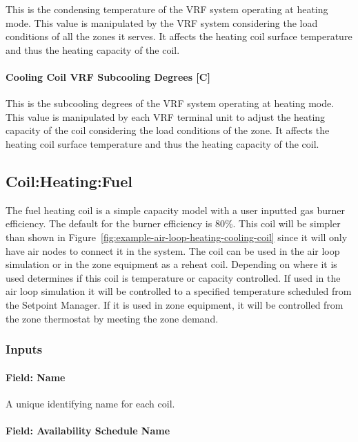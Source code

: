 This is the condensing temperature of the VRF system operating at heating mode. This value is manipulated by the VRF system considering the load conditions of all the zones it serves. It affects the heating coil surface temperature and thus the heating capacity of the coil.

\paragraph{Cooling Coil VRF Subcooling Degrees {[}C{]}}\label{cooling-coil-vrf-subcooling-degrees-c}

This is the subcooling degrees of the VRF system operating at heating mode. This value is manipulated by each VRF terminal unit to adjust the heating capacity of the coil considering the load conditions of the zone. It affects the heating coil surface temperature and thus the heating capacity of the coil.

\subsection{Coil:Heating:Fuel}\label{coilheatinggas-000}

The fuel heating coil is a simple capacity model with a user inputted gas burner efficiency. The default for the burner efficiency is 80\%. This coil will be simpler than shown in Figure~\ref{fig:example-air-loop-heating-cooling-coil} since it will only have air nodes to connect it in the system. The coil can be used in the air loop simulation or in the zone equipment as a reheat coil. Depending on where it is used determines if this coil is temperature or capacity controlled. If used in the air loop simulation it will be controlled to a specified temperature scheduled from the Setpoint Manager. If it is used in zone equipment, it will be controlled from the zone thermostat by meeting the zone demand.

\subsubsection{Inputs}\label{inputs-10-006}

\paragraph{Field: Name}\label{field-name-9-006}

A unique identifying name for each coil.

\paragraph{Field: Availability Schedule Name}\label{field-availability-schedule-name-4-003}

